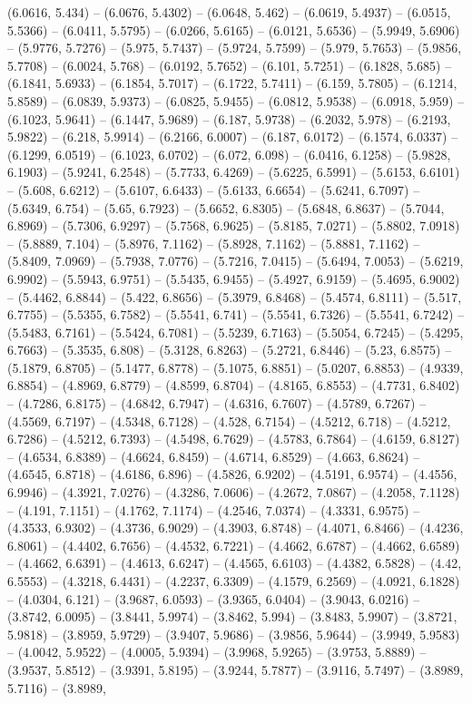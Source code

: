 (6.0616, 5.434) -- (6.0676, 5.4302) -- (6.0648, 5.462) -- (6.0619, 5.4937) -- (6.0515, 5.5366) -- (6.0411, 5.5795) -- (6.0266, 5.6165) -- (6.0121, 5.6536) -- (5.9949, 5.6906) -- (5.9776, 5.7276) -- (5.975, 5.7437) -- (5.9724, 5.7599) -- (5.979, 5.7653) -- (5.9856, 5.7708) -- (6.0024, 5.768) -- (6.0192, 5.7652) -- (6.101, 5.7251) -- (6.1828, 5.685) -- (6.1841, 5.6933) -- (6.1854, 5.7017) -- (6.1722, 5.7411) -- (6.159, 5.7805) -- (6.1214, 5.8589) -- (6.0839, 5.9373) -- (6.0825, 5.9455) -- (6.0812, 5.9538) -- (6.0918, 5.959) -- (6.1023, 5.9641) -- (6.1447, 5.9689) -- (6.187, 5.9738) -- (6.2032, 5.978) -- (6.2193, 5.9822) -- (6.218, 5.9914) -- (6.2166, 6.0007) -- (6.187, 6.0172) -- (6.1574, 6.0337) -- (6.1299, 6.0519) -- (6.1023, 6.0702) -- (6.072, 6.098) -- (6.0416, 6.1258) -- (5.9828, 6.1903) -- (5.9241, 6.2548) -- (5.7733, 6.4269) -- (5.6225, 6.5991) -- (5.6153, 6.6101) -- (5.608, 6.6212) -- (5.6107, 6.6433) -- (5.6133, 6.6654) -- (5.6241, 6.7097) -- (5.6349, 6.754) -- (5.65, 6.7923) -- (5.6652, 6.8305) -- (5.6848, 6.8637) -- (5.7044, 6.8969) -- (5.7306, 6.9297) -- (5.7568, 6.9625) -- (5.8185, 7.0271) -- (5.8802, 7.0918) -- (5.8889, 7.104) -- (5.8976, 7.1162) -- (5.8928, 7.1162) -- (5.8881, 7.1162) -- (5.8409, 7.0969) -- (5.7938, 7.0776) -- (5.7216, 7.0415) -- (5.6494, 7.0053) -- (5.6219, 6.9902) -- (5.5943, 6.9751) -- (5.5435, 6.9455) -- (5.4927, 6.9159) -- (5.4695, 6.9002) -- (5.4462, 6.8844) -- (5.422, 6.8656) -- (5.3979, 6.8468) -- (5.4574, 6.8111) -- (5.517, 6.7755) -- (5.5355, 6.7582) -- (5.5541, 6.741) -- (5.5541, 6.7326) -- (5.5541, 6.7242) -- (5.5483, 6.7161) -- (5.5424, 6.7081) -- (5.5239, 6.7163) -- (5.5054, 6.7245) -- (5.4295, 6.7663) -- (5.3535, 6.808) -- (5.3128, 6.8263) -- (5.2721, 6.8446) -- (5.23, 6.8575) -- (5.1879, 6.8705) -- (5.1477, 6.8778) -- (5.1075, 6.8851) -- (5.0207, 6.8853) -- (4.9339, 6.8854) -- (4.8969, 6.8779) -- (4.8599, 6.8704) -- (4.8165, 6.8553) -- (4.7731, 6.8402) -- (4.7286, 6.8175) -- (4.6842, 6.7947) -- (4.6316, 6.7607) -- (4.5789, 6.7267) -- (4.5569, 6.7197) -- (4.5348, 6.7128) -- (4.528, 6.7154) -- (4.5212, 6.718) -- (4.5212, 6.7286) -- (4.5212, 6.7393) -- (4.5498, 6.7629) -- (4.5783, 6.7864) -- (4.6159, 6.8127) -- (4.6534, 6.8389) -- (4.6624, 6.8459) -- (4.6714, 6.8529) -- (4.663, 6.8624) -- (4.6545, 6.8718) -- (4.6186, 6.896) -- (4.5826, 6.9202) -- (4.5191, 6.9574) -- (4.4556, 6.9946) -- (4.3921, 7.0276) -- (4.3286, 7.0606) -- (4.2672, 7.0867) -- (4.2058, 7.1128) -- (4.191, 7.1151) -- (4.1762, 7.1174) -- (4.2546, 7.0374) -- (4.3331, 6.9575) -- (4.3533, 6.9302) -- (4.3736, 6.9029) -- (4.3903, 6.8748) -- (4.4071, 6.8466) -- (4.4236, 6.8061) -- (4.4402, 6.7656) -- (4.4532, 6.7221) -- (4.4662, 6.6787) -- (4.4662, 6.6589) -- (4.4662, 6.6391) -- (4.4613, 6.6247) -- (4.4565, 6.6103) -- (4.4382, 6.5828) -- (4.42, 6.5553) -- (4.3218, 6.4431) -- (4.2237, 6.3309) -- (4.1579, 6.2569) -- (4.0921, 6.1828) -- (4.0304, 6.121) -- (3.9687, 6.0593) -- (3.9365, 6.0404) -- (3.9043, 6.0216) -- (3.8742, 6.0095) -- (3.8441, 5.9974) -- (3.8462, 5.994) -- (3.8483, 5.9907) -- (3.8721, 5.9818) -- (3.8959, 5.9729) -- (3.9407, 5.9686) -- (3.9856, 5.9644) -- (3.9949, 5.9583) -- (4.0042, 5.9522) -- (4.0005, 5.9394) -- (3.9968, 5.9265) -- (3.9753, 5.8889) -- (3.9537, 5.8512) -- (3.9391, 5.8195) -- (3.9244, 5.7877) -- (3.9116, 5.7497) -- (3.8989, 5.7116) -- (3.8989, 